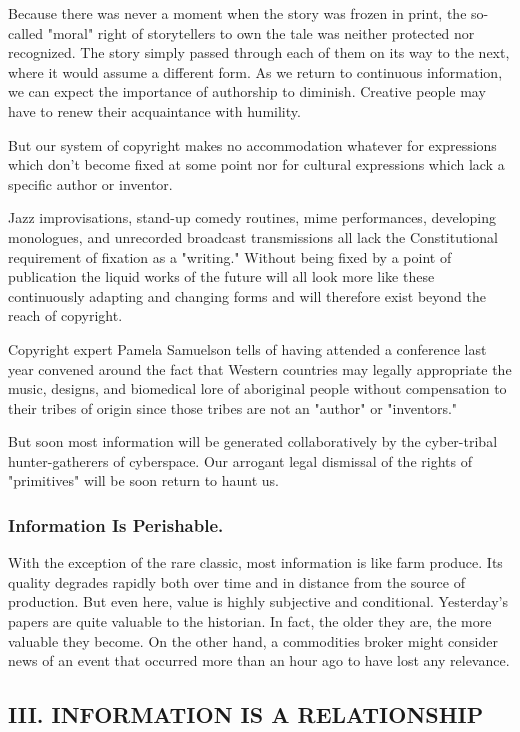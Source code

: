 \documentclass[
]{article}
\begin{document}
Because there was never a moment when the story was frozen in print, the
so-called "moral" right of storytellers to own the tale was neither
protected nor recognized. The story simply passed through each of them
on its way to the next, where it would assume a different form. As we
return to continuous information, we can expect the importance of
authorship to diminish. Creative people may have to renew their
acquaintance with humility.

But our system of copyright makes no accommodation whatever for
expressions which don't become fixed at some point nor for cultural
expressions which lack a specific author or inventor.

Jazz improvisations, stand-up comedy routines, mime performances,
developing monologues, and unrecorded broadcast transmissions all lack
the Constitutional requirement of fixation as a "writing." Without being
fixed by a point of publication the liquid works of the future will all
look more like these continuously adapting and changing forms and will
therefore exist beyond the reach of copyright.

Copyright expert Pamela Samuelson tells of having attended a conference
last year convened around the fact that Western countries may legally
appropriate the music, designs, and biomedical lore of aboriginal people
without compensation to their tribes of origin since those tribes are
not an "author" or "inventors."

But soon most information will be generated collaboratively by the
cyber-tribal hunter-gatherers of cyberspace. Our arrogant legal
dismissal of the rights of "primitives" will be soon return to haunt us.

\hypertarget{header-n284}{%
\subsubsection{Information Is Perishable.}\label{header-n284}}

With the exception of the rare classic, most information is like farm
produce. Its quality degrades rapidly both over time and in distance
from the source of production. But even here, value is highly subjective
and conditional. Yesterday's papers are quite valuable to the historian.
In fact, the older they are, the more valuable they become. On the other
hand, a commodities broker might consider news of an event that occurred
more than an hour ago to have lost any relevance.

\hypertarget{header-n286}{%
\subsection{III. INFORMATION IS A RELATIONSHIP}\label{header-n286}}
\end{document}
